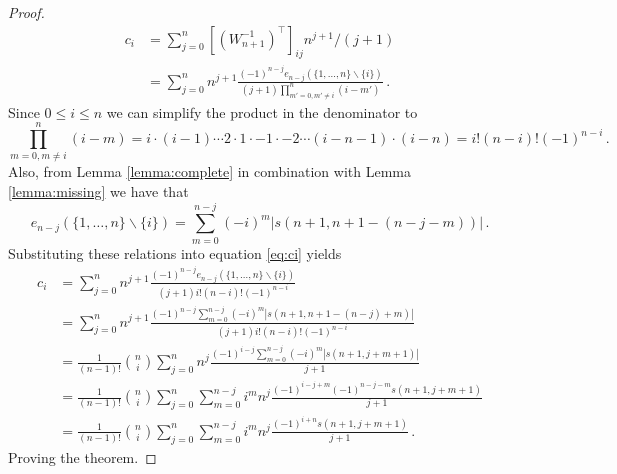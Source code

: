 \documentclass{article}
\newcommand{\setminusD}{\mathbin{\backslash}}
\begin{document}
\begin{proof}
\begin{align}
    c_i &= \sum_{j=0}^{n} \left[(W_{n+1}^{-1})^\top\right]_{ij} n^{j+1}/(j+1) \nonumber \\
        &= \sum_{j=0}^{n} n^{j+1} \frac{(-1)^{n-j} e_{n-j} (\{ 1, \dots, n \} \setminusD \{ i \})}{(j+1) \prod^{n}_{m'=0, m'\neq i} (i - m')} \,. \label{eq:ci}
\end{align}
Since $0 \leq i \leq n$ we can simplify the product in the denominator to
\begin{equation}
    \prod^{n}_{m=0, m\neq i} (i - m) = i \cdot (i-1) \cdots 2 \cdot 1 \cdot -1 \cdot -2 \cdots (i-n-1) \cdot (i-n) = i! (n-i)! (-1)^{n-i} \,. \nonumber
\end{equation}
Also, from Lemma \ref{lemma:complete} in combination with Lemma \ref{lemma:missing} we have that
\begin{equation}
    e_{n-j} (\{ 1, \dots, n \} \setminusD \{ i \}) = \sum_{m=0}^{n-j} (-i)^m |s(n+1, n+1-(n-j-m))| \,. \nonumber
\end{equation}
Substituting these relations into equation \ref{eq:ci} yields
\begin{align}
    c_i &= \sum_{j=0}^{n} n^{j+1} \frac{(-1)^{n-j} e_{n-j} (\{ 1, \dots, n \} \setminusD \{ i \})}{(j+1) i! (n-i)! (-1)^{n-i}} \nonumber \\
        &= \sum_{j=0}^{n} n^{j+1} \frac{(-1)^{n-j} \sum_{m=0}^{n-j} (-i)^m |s(n+1, n+1-(n-j)+m)| }{(j+1) i! (n-i)! (-1)^{n-i}} \nonumber \\
        &= \frac{1}{(n-1)!} \binom{n}{i} \sum_{j=0}^{n} n^{j} \frac{(-1)^{i-j} \sum_{m=0}^{n-j} (-i)^m |s(n+1, j+m+1)| }{j+1} \nonumber \\
        &= \frac{1}{(n-1)!} \binom{n}{i} \sum_{j=0}^{n} \sum_{m=0}^{n-j} i^m  n^{j} \frac{(-1)^{i-j+m} (-1)^{n-j-m} s(n+1, j+m+1) }{j+1} \nonumber \\
        &= \frac{1}{(n-1)!} \binom{n}{i} \sum_{j=0}^{n} \sum_{m=0}^{n-j} i^m n^{j} \frac{(-1)^{i+n} s(n+1, j+m+1) }{j+1} \,. \nonumber
\end{align}
Proving the theorem.
\end{proof}


\printbibliography
\end{document}
